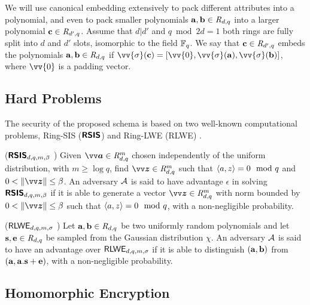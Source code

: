 We will use canonical embedding extensively to pack different attributes into a polynomial, and even to pack smaller polynomials $\mathbf{a},\mathbf{b} \in \mathit{R}_{d,q}$ into a larger polynomial $\mathbf{c} \in \mathit{R}_{d',q}$. Assume that $d|d'$ and $q \bmod 2d = 1$ both rings are fully split into $d$ and $d'$  slots, isomorphic to the field $\mathbb{F}_q$. We say that $\mathbf{c} \in \mathit{R}_{d',q}$ embeds the polynomials $\mathbf{a},\mathbf{b} \in \mathit{R}_{d,q}$ if $\vv{\sigma}(\pc)=[\vv{0},\vv{\sigma}(\pa),\vv{\sigma}(\pb)]$, where $\vv{0}$ is a padding vector.

\subsection{Hard Problems}

The security of the proposed schema is based on two well-known computational problems, Ring-SIS ($\textsf{\textbf{RSIS}}$) \cite{peikertEfficientCollisionResistantHashing2006}\cite{lyubashevskyGeneralizedCompactKnapsacks2006} and Ring-LWE (\ac{RLWE}) \cite{lyubashevskyIdealLatticesLearning2010}.

\begin{definition}
($\textsf{\textbf{RSIS}}_{d,q,m,\beta}$ \cite{langloisWorstcaseAveragecaseReductions2015}) Given $\pv{a}\in\intring_{d,q}^m$ chosen independently of the uniform distribution, with $m\geq \log q$, find $\pv{z}\in\intring_{d,q}^m$ such that $\langle a, z \rangle = 0 \mod q$ and $0<\|\pv{z}\|\leq\beta$. An adversary $\mathcal{A}$ is said to have advantage $\epsilon$ in solving $\textsf{\textbf{RSIS}}_{d,q,m,\beta}$ if it is able to generate a vector $\pv{z}\in\intring_{d,q}^m$ with norm bounded by $0<\|\pv{z}\|\leq\beta$ such that $\langle a, z \rangle = 0 \mod q$, with a non-negligible probability.
\end{definition}

\begin{definition}
($\textsf{RLWE}_{d,q,m,\sigma}$ \cite{langloisWorstcaseAveragecaseReductions2015}) Let $\mathbf{a},\mathbf{b} \in \mathit{R}_{d,q}$ be two uniformly random polynomials and let $\mathbf{s},\mathbf{e} \in \mathit{R}_{d,q}$ be sampled from the Gaussian distribution $\chi$. An adversary $\mathcal{A}$ is said to have an advantage over $\textsf{RLWE}_{d,q,m,\sigma}$ if it is able to distinguish $(\mathbf{a},\mathbf{b})$ from $(\mathbf{a},\mathbf{a}.\mathbf{s}+\mathbf{e})$, with a non-negligible probability.
\end{definition}


\subsection{Homomorphic Encryption}

